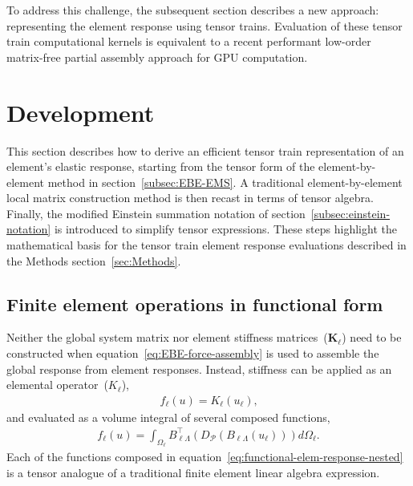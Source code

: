 \documentclass[]             %
{NASA}                       %
\begin{document}
%
To address this challenge, the subsequent section describes a new approach: representing the element response using tensor trains. Evaluation of these tensor train computational kernels is equivalent to a recent performant low-order matrix-free partial assembly approach for GPU computation.\cite{ref:settgast2023performant}

\section{Development}
\label{sec:Development}

This section describes how to derive an efficient tensor train representation of an element's elastic response, starting from the tensor form of the element-by-element method in section~\ref{subsec:EBE-EMS}. A traditional element-by-element local matrix construction method is then recast in terms of tensor algebra. Finally, the modified Einstein summation notation of section~\ref{subsec:einstein-notation} is introduced to simplify tensor expressions. These steps highlight the mathematical basis for the tensor train element response evaluations described in the Methods section~\ref{sec:Methods}.

\subsection{Finite element operations in functional form}

Neither the global system matrix nor element stiffness matrices~($\mathbf{K}_{\ell}$) 
need to be constructed when
equation~\ref{eq:EBE-force-assembly} is used to assemble the global response from element responses.
 Instead, stiffness can be applied as an elemental operator~($K_{\ell}$),
\begin{eqnarray}
f_{\ell}(u) = K_{\ell}(u_{\ell})\text{,}\label{eq:functional-elem-response}
\end{eqnarray}
and evaluated as a volume integral of several composed functions,
\begin{eqnarray}
f_{\ell}(u) = \int_{\Omega_{\ell}}B_{\ell\Lambda}^{\top}(D_{\mathcal{P}}(B_{\ell\Lambda}(u_{\ell})))d\Omega_{\ell}\text{.}\label{eq:functional-elem-response-nested}
\end{eqnarray}
Each of the functions composed in equation~\ref{eq:functional-elem-response-nested}
is a tensor analogue of a traditional finite element linear algebra expression.
\end{document}
